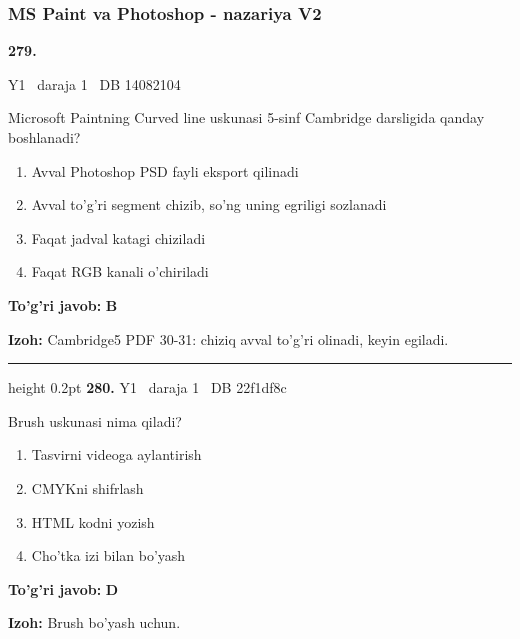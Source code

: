\documentclass[10pt,a4paper,oneside]{article}
\begin{document}
\subsubsection{MS Paint va Photoshop - nazariya V2}
\hypertarget{q279}{\textbf{\color{ink}279.}}  {\color{muted}\scriptsize Y1 \textbullet\ daraja 1 \textbullet\ DB 14082104}
\par
Microsoft Paintning Curved line uskunasi 5-sinf Cambridge darsligida qanday boshlanadi?
\begin{enumerate}[label=\Alph*),leftmargin=9mm]
\item Avval Photoshop PSD fayli eksport qilinadi
\item Avval to'g'ri segment chizib, so'ng uning egriligi sozlanadi
\item Faqat jadval katagi chiziladi
\item Faqat RGB kanali o'chiriladi
\end{enumerate}
\begin{tcolorbox}[enhanced,breakable,colback=teal!4,colframe=teal!45!black,boxrule=0.45pt,arc=1.2mm,left=2.8mm,right=2.8mm,top=2mm,bottom=2mm,before skip=2mm,after skip=2mm]
\textbf{\color{teal}To'g'ri javob:} \textbf{B}
\par\smallskip
\textbf{Izoh:} Cambridge5 PDF 30-31: chiziq avval to'g'ri olinadi, keyin egiladi.
\end{tcolorbox}
\vspace{2mm}\hrule height 0.2pt \vspace{4mm}
\hypertarget{q280}{\textbf{\color{ink}280.}}  {\color{muted}\scriptsize Y1 \textbullet\ daraja 1 \textbullet\ DB 22f1df8c}
\par
Brush uskunasi nima qiladi?
\begin{enumerate}[label=\Alph*),leftmargin=9mm]
\item Tasvirni videoga aylantirish
\item CMYKni shifrlash
\item HTML kodni yozish
\item Cho'tka izi bilan bo'yash
\end{enumerate}
\begin{tcolorbox}[enhanced,breakable,colback=teal!4,colframe=teal!45!black,boxrule=0.45pt,arc=1.2mm,left=2.8mm,right=2.8mm,top=2mm,bottom=2mm,before skip=2mm,after skip=2mm]
\textbf{\color{teal}To'g'ri javob:} \textbf{D}
\par\smallskip
\textbf{Izoh:} Brush bo'yash uchun.
\end{tcolorbox}
\end{document}
